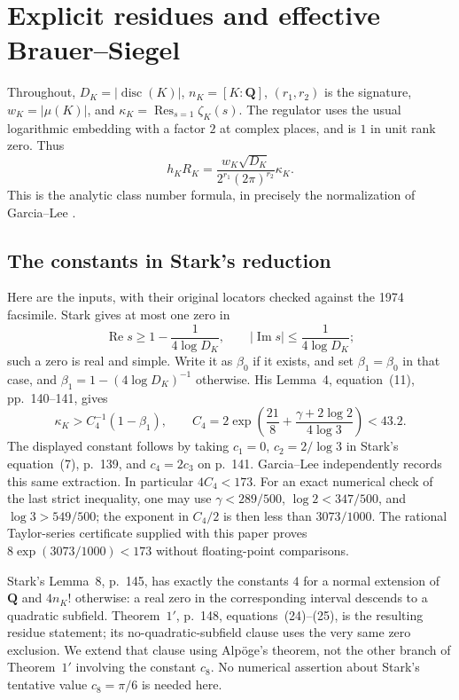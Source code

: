 \documentclass[11pt]{article}
\theoremstyle{remark}
\begin{document}
\section{Explicit residues and effective Brauer--Siegel}
\label{sec:normal}

Throughout, $D_K=|\operatorname{disc}(K)|$, $n_K=[K:\mathbf Q]$,
$(r_1,r_2)$ is the signature, $w_K=|\mu(K)|$, and
$\kappa_K=\operatorname*{Res}_{s=1}\zeta_K(s)$.
The regulator uses the usual logarithmic embedding with a factor $2$
at complex places, and is $1$ in unit rank zero. Thus
\begin{equation}\label{eq:classformula}
 h_KR_K=\frac{w_K\sqrt{D_K}}{2^{r_1}(2\pi)^{r_2}}\kappa_K.
\end{equation}
This is the analytic class number formula, in precisely the normalization
of Garcia--Lee \cite[(1), p.~2]{GarciaLee}.

\subsection{The constants in Stark's reduction}

Here are the inputs, with their original locators checked against the
1974 facsimile. Stark \cite[Lemma~3, pp.~139--140]{Stark} gives at most one
zero in
\[
 \operatorname{Re}s\geq1-\frac1{4\log D_K},\qquad
 |\operatorname{Im}s|\leq\frac1{4\log D_K};
\]
such a zero is real and simple. Write it as $\beta_0$ if it exists, and
set $\beta_1=\beta_0$ in that case, and
$\beta_1=1-(4\log D_K)^{-1}$ otherwise. His Lemma~4, equation~(11),
pp.~140--141, gives
\begin{equation}\label{eq:stark-residue}
 \kappa_K>C_4^{-1}(1-\beta_1),\qquad
 C_4=2\exp\left(\frac{21}{8}
                 +\frac{\gamma+2\log2}{4\log3}\right)<43.2.
\end{equation}
The displayed constant follows by taking $c_1=0$, $c_2=2/\log3$ in
Stark's equation~(7), p.~139, and $c_4=2c_3$ on p.~141.
Garcia--Lee \cite[\S3, pp.~16--17]{GarciaLee} independently records this
same extraction. In particular $4C_4<173$.
For an exact numerical check of the last strict inequality, one may use
$\gamma<289/500$, $\log2<347/500$, and $\log3>549/500$;
the exponent in $C_4/2$ is then less than $3073/1000$.
The rational Taylor-series certificate supplied with this paper proves
$8\exp(3073/1000)<173$ without floating-point comparisons.

Stark's Lemma~8, p.~145, has exactly the constants $4$ for a normal
extension of $\mathbf Q$ and $4n_K!$ otherwise: a real zero in the
corresponding interval descends to a quadratic subfield. Theorem~$1'$,
p.~148, equations~(24)--(25), is the resulting residue statement;
its no-quadratic-subfield clause uses the very same zero exclusion.
We extend that clause using Alp\"oge's theorem, not the other branch of
Theorem~$1'$ involving the constant $c_8$. No numerical assertion about
Stark's tentative value $c_8=\pi/6$ is needed here.
\end{document}
